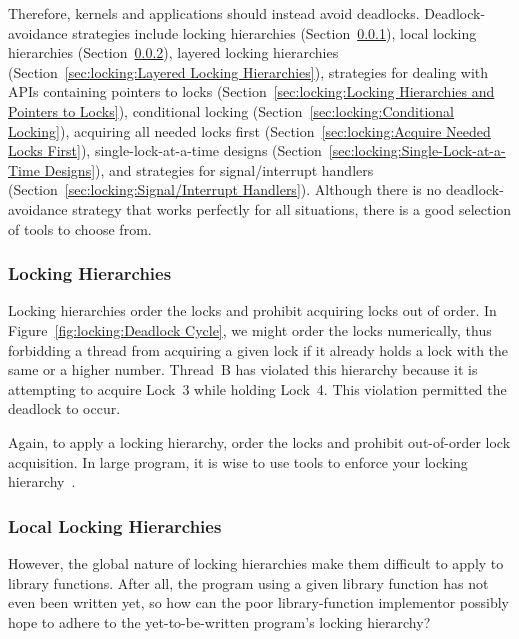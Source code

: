 Therefore, kernels and applications should instead avoid deadlocks.
Deadlock-avoidance strategies include locking hierarchies
(Section~\ref{sec:locking:Locking Hierarchies}),
local locking hierarchies
(Section~\ref{sec:locking:Local Locking Hierarchies}),
layered locking hierarchies
(Section~\ref{sec:locking:Layered Locking Hierarchies}),
strategies for dealing with APIs containing pointers to locks
(Section~\ref{sec:locking:Locking Hierarchies and Pointers to Locks}),
conditional locking
(Section~\ref{sec:locking:Conditional Locking}),
acquiring all needed locks first
(Section~\ref{sec:locking:Acquire Needed Locks First}),
single-lock-at-a-time designs
(Section~\ref{sec:locking:Single-Lock-at-a-Time Designs}),
and strategies for signal/interrupt handlers
(Section~\ref{sec:locking:Signal/Interrupt Handlers}).
Although there is no deadlock-avoidance strategy that works perfectly
for all situations, there is a good selection of tools to choose from.

\subsubsection{Locking Hierarchies}
\label{sec:locking:Locking Hierarchies}

Locking hierarchies order the locks and prohibit acquiring locks out
of order.
In Figure~\ref{fig:locking:Deadlock Cycle},
we might order the locks numerically, thus forbidding a thread
from acquiring a given lock if it already holds a lock
with the same or a higher number.
Thread~B has violated this hierarchy because it is attempting to
acquire Lock~3 while holding Lock~4.
This violation permitted the deadlock to occur.

Again, to apply a locking hierarchy, order the locks and prohibit
out-of-order lock acquisition.
In large program, it is wise to use tools to enforce your locking
hierarchy~\cite{JonathanCorbet2006lockdep}.

\subsubsection{Local Locking Hierarchies}
\label{sec:locking:Local Locking Hierarchies}

However, the global nature of locking hierarchies make them difficult to
apply to library functions.
After all, the program using a given library function has not even been
written yet, so how can the poor library-function implementor possibly
hope to adhere to the yet-to-be-written program's locking hierarchy?

